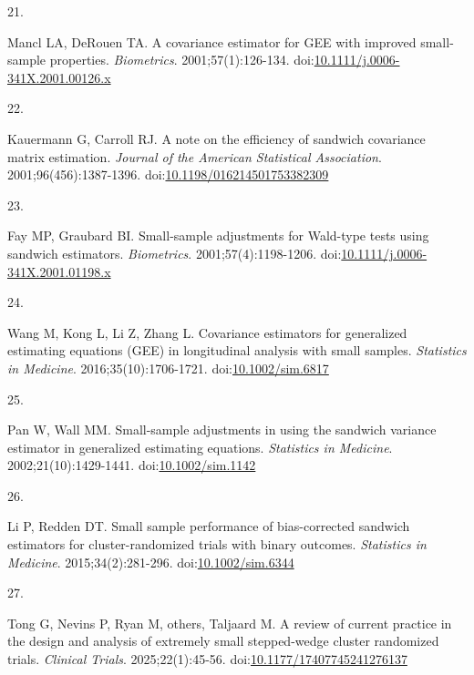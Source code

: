 \documentclass[
  11pt,
]{article}
\newlength{\cslhangindent}
\newlength{\csllabelwidth}
\newenvironment{CSLReferences}[2] %
 {\begin{list}{}{%
  \setlength{\itemindent}{0pt}
  \setlength{\leftmargin}{0pt}
  \setlength{\parsep}{0pt}
  \ifodd #1
   \setlength{\leftmargin}{\cslhangindent}
   \setlength{\itemindent}{-1\cslhangindent}
  \fi
  \setlength{\itemsep}{#2\baselineskip}}}
 {\end{list}}
\newcommand{\CSLLeftMargin}[1]{\parbox[t]{\csllabelwidth}{\strut#1\strut}}
\newcommand{\CSLRightInline}[1]{\parbox[t]{\linewidth - \csllabelwidth}{\strut#1\strut}}
\begin{document}
\begin{CSLReferences}{0}{1}
\CSLLeftMargin{21. }%
\CSLRightInline{Mancl LA, DeRouen TA. A covariance estimator for {GEE} with improved small-sample properties. \emph{Biometrics}. 2001;57(1):126-134. doi:\href{https://doi.org/10.1111/j.0006-341X.2001.00126.x}{10.1111/j.0006-341X.2001.00126.x}}

\CSLLeftMargin{22. }%
\CSLRightInline{Kauermann G, Carroll RJ. A note on the efficiency of sandwich covariance matrix estimation. \emph{Journal of the American Statistical Association}. 2001;96(456):1387-1396. doi:\href{https://doi.org/10.1198/016214501753382309}{10.1198/016214501753382309}}

\CSLLeftMargin{23. }%
\CSLRightInline{Fay MP, Graubard BI. Small-sample adjustments for {Wald}-type tests using sandwich estimators. \emph{Biometrics}. 2001;57(4):1198-1206. doi:\href{https://doi.org/10.1111/j.0006-341X.2001.01198.x}{10.1111/j.0006-341X.2001.01198.x}}

\CSLLeftMargin{24. }%
\CSLRightInline{Wang M, Kong L, Li Z, Zhang L. Covariance estimators for generalized estimating equations ({GEE}) in longitudinal analysis with small samples. \emph{Statistics in Medicine}. 2016;35(10):1706-1721. doi:\href{https://doi.org/10.1002/sim.6817}{10.1002/sim.6817}}

\CSLLeftMargin{25. }%
\CSLRightInline{Pan W, Wall MM. Small-sample adjustments in using the sandwich variance estimator in generalized estimating equations. \emph{Statistics in Medicine}. 2002;21(10):1429-1441. doi:\href{https://doi.org/10.1002/sim.1142}{10.1002/sim.1142}}

\CSLLeftMargin{26. }%
\CSLRightInline{Li P, Redden DT. Small sample performance of bias-corrected sandwich estimators for cluster-randomized trials with binary outcomes. \emph{Statistics in Medicine}. 2015;34(2):281-296. doi:\href{https://doi.org/10.1002/sim.6344}{10.1002/sim.6344}}

\CSLLeftMargin{27. }%
\CSLRightInline{{Tong G, Nevins P, Ryan M, others, Taljaard M}. A review of current practice in the design and analysis of extremely small stepped-wedge cluster randomized trials. \emph{Clinical Trials}. 2025;22(1):45-56. doi:\href{https://doi.org/10.1177/17407745241276137}{10.1177/17407745241276137}}


\end{CSLReferences}
\end{document}
